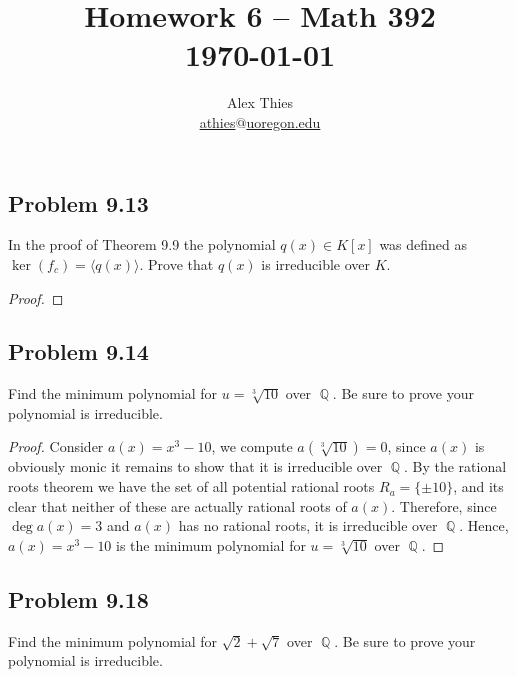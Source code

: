 \documentclass[letterpaper, 12pt]{amsart}
\DeclareMathOperator{\Q}{\mathbb{Q}}
\newcommand{\pid}[1]{\langle #1 \rangle}
\theoremstyle{definition}  %
\begin{document}
	\title{Homework 6  -- Math 392 \\ \today}
	\author{Alex Thies \\ \href{mailto:athies@uoregon.edu}{\lowercase{athies$@$uoregon.edu}}}

	\maketitle

	\subsection*{Problem 9.13}
	\label{sub:problem_9_13}
	In the proof of Theorem 9.9 the polynomial $q(x) \in K[x]$ was defined as $\ker{(f_{c})} = \pid{q(x)}$.
	Prove that $q(x)$ is irreducible over $K$.

		\begin{proof}
		\end{proof}

	\subsection*{Problem 9.14}
	\label{sub:problem_9_14}
	Find the minimum polynomial for $u = \sqrt[3]{10}$ over $\Q$.
	Be sure to prove your polynomial is irreducible.

		\begin{proof}
		Consider $a(x) = x^{3} - 10$, we compute $a(\sqrt[3]{10}) =  0$, since $a(x)$ is obviously monic it remains to show that it is irreducible over $\Q$.
		By the rational roots theorem we have the set of all potential rational roots $R_{a} = \{ \pm 10 \}$, and its clear that neither of these are actually rational roots of $a(x)$.
		Therefore, since $\deg{a(x)} = 3$ and $a(x)$ has no rational roots, it is irreducible over $\Q$.
		Hence, $a(x) = x^{3} - 10$ is the minimum polynomial for $u = \sqrt[3]{10}$ over $\Q$.
		\end{proof}

	\subsection*{Problem 9.18}
	\label{sub:problem_9_18}
	Find the minimum polynomial for $\sqrt{2} + \sqrt{7}$ over $\Q$.
	Be sure to prove your polynomial is irreducible.
\end{document}
